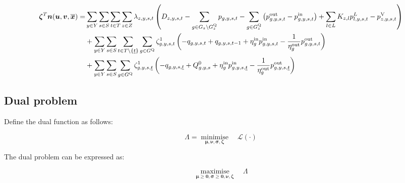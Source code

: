 \documentclass{article}
\DeclareMathOperator*{\minimise}{minimise}
\DeclareMathOperator*{\maximise}{maximise}
\begin{document}
\begin{align}
	\begin{split}
		\bm{\zeta}^{T} \bm{n}(\bm{u}, \bm{v}, \bm{\overline{x}}) = 	& \sum\limits_{\iYear \in \sYears}\sum\limits_{\iScenario \in \sScenarios}\sum\limits_{\iInterval \in \sIntervals} \sum\limits_{\iZone \in \sZones} \dPowerBalance \left(\cDemand - \sum\limits_{\iGenerator \in \sGenerators_{\iZone} \setminus \sStorage_{\iZone}} \vPower - \sum\limits_{\iGenerator \in \sStorage_{\iZone}} \left(\vPowerOut - \vPowerIn\right) + \sum\limits_{\iLink \in \sLinks} \cIncidenceMatrix \vPowerFlow - \vLostLoadPower \right)\\
		& + \sum\limits_{\iYear \in \sYears}\sum\limits_{\iScenario \in \sScenarios}\sum\limits_{\iInterval \in \sIntervals \setminus \{\iIntervalStart\}} \sum\limits_{\iGenerator \in \sStorage} \dStorageEnergyTransition \left(-\vStorageUnitEnergy + \vStorageUnitEnergy[\iGenerator,\iYear,\iScenario,\iInterval-1] + \cStorageUnitEfficiencyCharging \vPowerIn - \frac{1}{\cStorageUnitEfficiencyDischarging} \vPowerOut \right)\\
		& + \sum\limits_{\iYear \in \sYears} \sum\limits_{\iScenario \in \sScenarios} \sum\limits_{\iGenerator \in \sStorage} \dStorageEnergyTransition[\iGenerator,\iYear,\iScenario,\iIntervalStart] \left(-\vStorageUnitEnergy[\iGenerator,\iYear,\iScenario,\iIntervalStart] + \cStorageEnergyInitial + \cStorageUnitEfficiencyCharging \vPowerIn[\iGenerator,\iYear,\iScenario,\iIntervalStart] - \frac{1}{\cStorageUnitEfficiencyDischarging} \vPowerOut[\iGenerator,\iYear,\iScenario,\iIntervalStart] \right)\\
	\end{split}
\end{align}

\subsection{Dual problem}
Define the dual function as follows:

\begin{equation}
	\Lambda = \minimise\limits_{\bm{\mu}, \bm{\nu}, \bm{\sigma}, \bm{\zeta}} \quad \mathcal{L}(\cdot)
\end{equation}

The dual problem can be expressed as:

\begin{equation}
	\maximise\limits_{\bm{\mu}\geq \bm{0}, \bm{\sigma}\geq \bm{0}, \bm{\nu}, \bm{\zeta}} \quad \Lambda
\end{equation}
\end{document}
